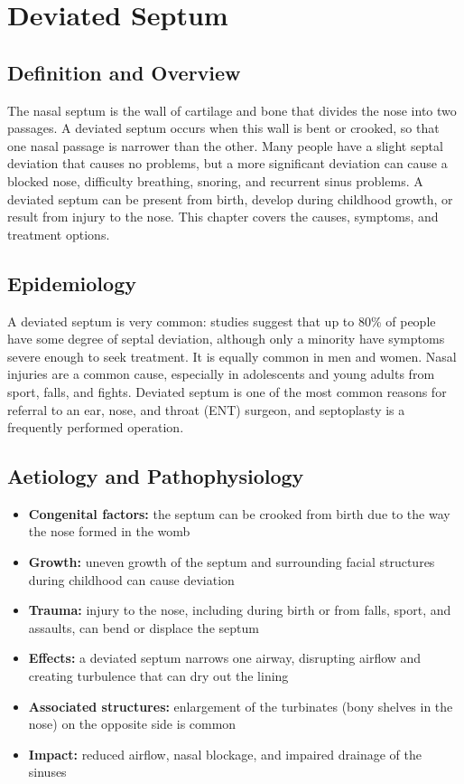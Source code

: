 \chapter{Deviated Septum}

\section*{Definition and Overview}
The nasal septum is the wall of cartilage and bone that divides the nose into two passages. A deviated septum occurs when this wall is bent or crooked, so that one nasal passage is narrower than the other. Many people have a slight septal deviation that causes no problems, but a more significant deviation can cause a blocked nose, difficulty breathing, snoring, and recurrent sinus problems. A deviated septum can be present from birth, develop during childhood growth, or result from injury to the nose. This chapter covers the causes, symptoms, and treatment options.

\section*{Epidemiology}
A deviated septum is very common: studies suggest that up to 80\% of people have some degree of septal deviation, although only a minority have symptoms severe enough to seek treatment. It is equally common in men and women. Nasal injuries are a common cause, especially in adolescents and young adults from sport, falls, and fights. Deviated septum is one of the most common reasons for referral to an ear, nose, and throat (ENT) surgeon, and septoplasty is a frequently performed operation.

\section*{Aetiology and Pathophysiology}
\begin{itemize}
    \item \textbf{Congenital factors:} the septum can be crooked from birth due to the way the nose formed in the womb
    \item \textbf{Growth:} uneven growth of the septum and surrounding facial structures during childhood can cause deviation
    \item \textbf{Trauma:} injury to the nose, including during birth or from falls, sport, and assaults, can bend or displace the septum
    \item \textbf{Effects:} a deviated septum narrows one airway, disrupting airflow and creating turbulence that can dry out the lining
    \item \textbf{Associated structures:} enlargement of the turbinates (bony shelves in the nose) on the opposite side is common
    \item \textbf{Impact:} reduced airflow, nasal blockage, and impaired drainage of the sinuses
\end{itemize}

